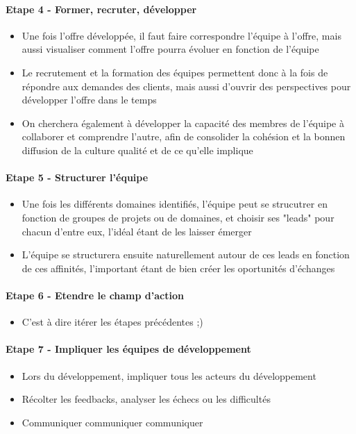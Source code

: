 \begin{frame}{\insertsectionhead}
  \framesubtitle{Etape 4 - Former, recruter, développer}
    \begin{itemize}
      \item Une fois l'offre développée, il faut faire correspondre l'équipe à l'offre, mais aussi visualiser comment l'offre pourra évoluer en fonction de l'équipe
      \item Le recrutement et la formation des équipes permettent donc à la fois de répondre aux demandes des clients, mais aussi d'ouvrir des perspectives pour développer l'offre dans le temps
      \item On cherchera également à développer la capacité des membres de l'équipe à collaborer et comprendre l'autre, afin de consolider la cohésion et la bonnen diffusion de la culture qualité et de ce qu'elle implique
    \end{itemize}
\end{frame}

\begin{frame}{\insertsectionhead}
  \framesubtitle{Etape 5 - Structurer l'équipe}
  
    \begin{itemize}
      \item Une fois les différents domaines identifiés, l'équipe peut se strucutrer en fonction de groupes de projets ou de domaines, et choisir ses "leads" pour chacun d'entre eux, l'idéal étant de les laisser émerger
      \item L'équipe se structurera ensuite naturellement autour de ces leads en fonction de ces affinités, l'important étant de bien créer les oportunités d'échanges
    \end{itemize}
\end{frame}

\begin{frame}{\insertsectionhead}
  \framesubtitle{Etape 6 - Etendre le champ d'action}
 
    \begin{itemize}
      \item C'est à dire itérer les étapes précédentes ;)
    \end{itemize}
\end{frame}

\begin{frame}{\insertsectionhead}
  \framesubtitle{Etape 7 - Impliquer les équipes de développement}
    \begin{itemize}
     \item Lors du développement, impliquer tous les acteurs du développement
     \item Récolter les feedbacks, analyser les échecs ou les difficultés
     \item Communiquer communiquer communiquer
    \end{itemize}
\end{frame}

